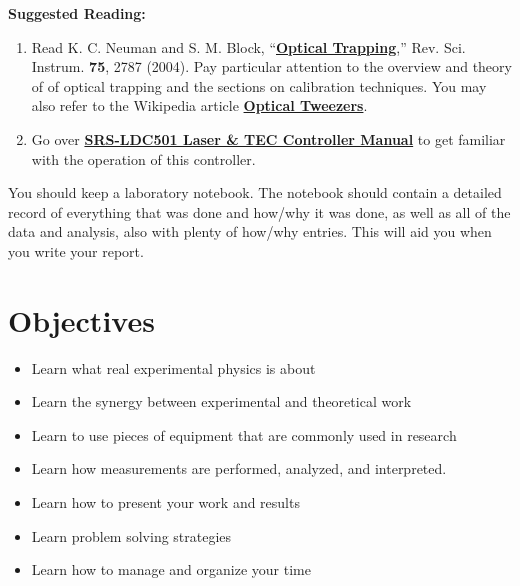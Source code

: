 \documentclass{../lab}
\begin{document}
\textbf{Suggested Reading:}

\begin{enumerate}
    \item Read K. C. Neuman and S. M. Block, ``\href{http://physics111.lib.berkeley.edu/Physics111/Reprints/OTZ/Neuman-optical_Trapping.pdf}{\textbf{Optical Trapping}},'' Rev. Sci. Instrum. \textbf{75}, 2787 (2004). Pay particular attention to the overview and theory of of optical trapping and the sections on calibration techniques. You may also refer to the Wikipedia article \href{http://en.wikipedia.org/wiki/Optical\_tweezers}{\textbf{Optical Tweezers}}.

    \item Go over \href{http://experimentationlab.berkeley.edu/sites/default/files/images/LDC501m.pdf}{\textbf{SRS-LDC501 Laser \& TEC Controller Manual}} to get familiar with the operation of this controller.

\end{enumerate}

You should keep a laboratory notebook. The notebook should contain a detailed record of everything that was done and how/why it was done, as well as all of the data and analysis, also with plenty of how/why entries. This will aid you when you write your report.

\section{Objectives}

\begin{itemize}
    \item Learn what real experimental physics is about

    \item Learn the synergy between experimental and theoretical work

    \item Learn to use pieces of equipment that are commonly used in research

    \item Learn how measurements are performed, analyzed, and interpreted.

    \item Learn how to present your work and results

    \item Learn problem solving strategies

    \item Learn how to manage and organize your time
\end{itemize}
\end{document}
